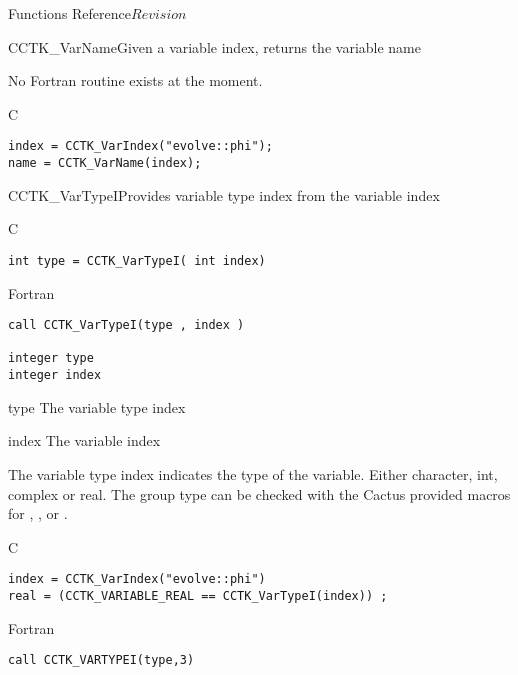 \begin{cactuspart}{ Functions Reference}{}{$Revision$}
\begin{FunctionDescription}{CCTK\_VarName}{Given a variable index, returns the variable name}
\begin{Discussion}
No Fortran routine exists at the moment.
\end{Discussion}
\begin{ExampleSection}
\begin{Example}{C}
\begin{verbatim}
index = CCTK_VarIndex("evolve::phi");
name = CCTK_VarName(index);
\end{verbatim}
\end{Example}
\end{ExampleSection}
\end{FunctionDescription}


\begin{FunctionDescription}{CCTK\_VarTypeI}{Provides variable type index from the variable index}
\label{CCTK-VarTypeI}
\begin{SynopsisSection}
\begin{Synopsis}{C}
\begin{verbatim}int type = CCTK_VarTypeI( int index)\end{verbatim}
\end{Synopsis}
\begin{Synopsis}{Fortran}
\begin{verbatim}call CCTK_VarTypeI(type , index )

integer type
integer index\end{verbatim}
\end{Synopsis}
\end{SynopsisSection}
\begin{ParameterSection}
\begin{Parameter}{type}
The variable type index
\end{Parameter}
\begin{Parameter}{index}
The variable index
\end{Parameter}
\end{ParameterSection}
\begin{Discussion}
The variable type index indicates the type of the variable.
Either character, int, complex or real. The group type can be checked
with the Cactus provided macros for , ,  or .
\end{Discussion}
\begin{ExampleSection}
\begin{Example}{C}
\begin{verbatim}
index = CCTK_VarIndex("evolve::phi")
real = (CCTK_VARIABLE_REAL == CCTK_VarTypeI(index)) ;
\end{verbatim}
\end{Example}
\begin{Example}{Fortran}
\begin{verbatim}
call CCTK_VARTYPEI(type,3)
\end{verbatim}
\end{Example}
\end{ExampleSection}
\end{FunctionDescription}


\end{cactuspart}
